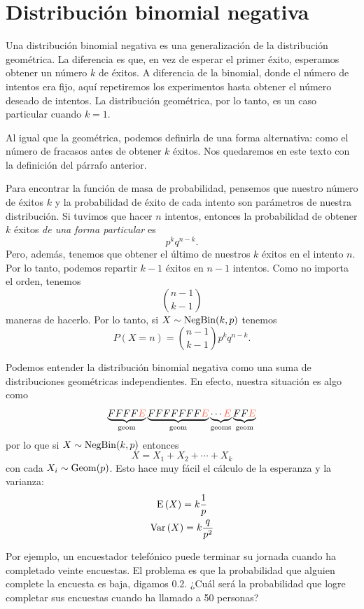 \section{Distribución binomial negativa}

Una distribución binomial negativa es una generalización de la distribución geométrica. La diferencia es que, en vez de esperar el primer éxito, esperamos obtener un número \(k\) de éxitos. A diferencia de la binomial, donde el número de intentos era fijo, aquí repetiremos los experimentos hasta obtener el número deseado de intentos. La distribución geométrica, por lo tanto, es un caso particular cuando \(k=1\).

Al igual que la geométrica, podemos definirla de una forma alternativa: como el número de fracasos antes de obtener \(k\) éxitos. Nos quedaremos en este texto con la definición del párrafo anterior.

Para encontrar la función de masa de probabilidad, pensemos que nuestro número de éxitos \(k\) y la probabilidad de éxito de cada intento son parámetros de nuestra distribución. Si tuvimos que hacer \(n\) intentos, entonces la probabilidad de obtener \(k\) éxitos \emph{de una forma particular} es \[p^kq^{n-k}.\] Pero, además, tenemos que obtener el último de nuestros \(k\) éxitos en el intento \(n\). Por lo tanto, podemos repartir \(k-1\) éxitos en \(n-1\) intentos. Como no importa el orden, tenemos \[\binom{n-1}{k-1}\] maneras de hacerlo. Por lo tanto, si \(X\sim\operatorname{NegBin}(k, p)\) tenemos \[P(X=n)=\binom{n-1}{k-1}p^kq^{n-k}.\]

Podemos entender la distribución binomial negativa como una suma de distribuciones geométricas independientes. En efecto, nuestra situación es algo como \[\underbrace{FFFF\mathcolor{Tomato1}{E}}_{\text{geom}}\underbrace{FFFFFFF\mathcolor{Tomato1}{E}}_{\text{geom}}\underbrace{\cdots \mathcolor{Tomato1}{E}}_{\text{geoms}}\underbrace{FF\mathcolor{Tomato1}{E}}_{\text{geom}}\] por lo que si \(X\sim\operatorname{NegBin}(k, p)\) entonces \[X=X_1+X_2+\cdots+X_k\] con cada \(X_i\sim\operatorname{Geom}(p)\). Esto hace muy fácil el cálculo de la esperanza y la varianza:
\begin{gather*}
  \operatorname{E}\left(X\right)= k\frac{1}{p}\\
  \operatorname{Var}\left(X\right) = k\frac{q}{p^2}
\end{gather*}

Por ejemplo, un encuestador telefónico puede terminar su jornada cuando ha completado veinte encuestas. El problema es que la probabilidad que alguien complete la encuesta es baja, digamos \num{0,2}. ¿Cuál será la probabilidad que logre completar sus encuestas cuando ha llamado a 50 personas?

